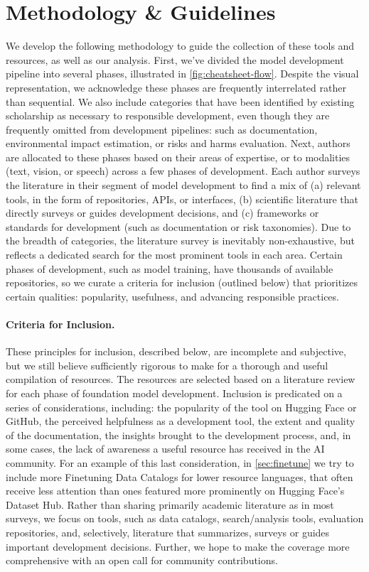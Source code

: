 \clearpage
\section{Methodology \& Guidelines}
\label{sec:methodology}

We develop the following methodology to guide the collection of these tools and resources, as well as our analysis.
First, we've divided the model development pipeline into several phases, illustrated in \cref{fig:cheatsheet-flow}.
Despite the visual representation, we acknowledge these phases are frequently interrelated rather than sequential.
We also include categories that have been identified by existing scholarship as necessary to responsible development, even though they are frequently omitted from development pipelines: such as documentation, environmental impact estimation, or risks and harms evaluation.
Next, authors are allocated to these phases based on their areas of expertise, or to modalities (text, vision, or speech) across a few phases of development.
Each author surveys the literature in their segment of model development to find a mix of (a) relevant tools, in the form of repositories, APIs, or interfaces, (b) scientific literature that directly surveys or guides development decisions, and (c) frameworks or standards for development (such as documentation or risk taxonomies).
Due to the breadth of categories, the literature survey is inevitably non-exhaustive, but reflects a dedicated search for the most prominent tools in each area.
Certain phases of development, such as model training, have thousands of available repositories, so we curate a criteria for inclusion (outlined below) that prioritizes certain qualities: popularity, usefulness, and advancing responsible practices.

\paragraph{Criteria for Inclusion.}
\label{sec:criteria}
These principles for inclusion, described below, are incomplete and subjective, but we still believe sufficiently rigorous to make for a thorough and useful compilation of resources.
The resources are selected based on a literature review for each phase of foundation model development. 
Inclusion is predicated on a series of considerations, including: the popularity of the tool on Hugging Face or GitHub, the perceived helpfulness as a development tool, the extent and quality of the documentation, the insights brought to the development process, and, in some cases, the lack of awareness a useful resource has received in the AI community.
For an example of this last consideration, in \cref{sec:finetune} we try to include more Finetuning Data Catalogs for lower resource languages, that often receive less attention than ones featured more prominently on Hugging Face's Dataset Hub.
Rather than sharing primarily academic literature as in most surveys, we focus on tools, such as data catalogs, search/analysis tools, evaluation repositories, and, selectively, literature that summarizes, surveys or guides important development decisions.
Further, we hope to make the coverage more comprehensive with an open call for community contributions.

